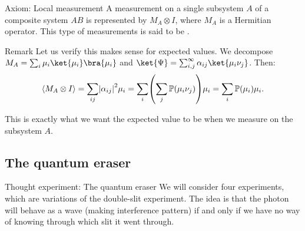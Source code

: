 \documentclass[a4paper]{article}
\begin{document}
\begin{parag}{Axiom: Local measurement}
    A measurement on a single subsystem $A$ of a composite system $AB$ is represented by $M_A \otimes I$, where $M_A$ is a Hermitian operator. This type of measurements is said to be .

    \begin{subparag}{Remark}
        Let us verify this makes sense for expected values. We decompose $M_A = \sum_{i} \mu_i \ket{\mu_i}\bra{\mu_i}$ and $\ket{\Psi} = \sum_{i,j}^{\infty} \alpha_{ij} \ket{\mu_i \nu_j}$. Then: 
        \[\left\langle M_A \otimes I \right\rangle = \sum_{ij} \left|\alpha_{ij}\right|^2 \mu_{i} = \sum_{i} \left(\sum_{j} \prob\left(\mu_i \nu_j\right)\right) \mu_i = \sum_{i} \prob\left(\mu_i\right) \mu_i.\]

        This is exactly what we want the expected value to be when we measure on the subsystem $A$.
    \end{subparag}
\end{parag}

\subsection{The quantum eraser}

\begin{parag}{Thought experiment: The quantum eraser}
    We will consider four experiments, which are variations of the double-slit experiment. The idea is that the photon will behave as a wave (making interference pattern) if and only if we have no way of knowing through which slit it went through.
\end{parag}
\end{document}
